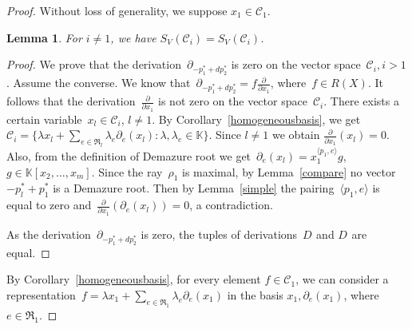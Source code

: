 \documentclass[a4paper,reqno,12pt]{amsart}
\DeclareMathOperator {\NNA}{(2)}
\DeclareMathOperator {\NA}{(1)}
\def\K  {\mathbb K}
\newtheorem{lmm}{Lemma}
\theoremstyle{definition}
\begin{document}
\begin{proof}
  Without loss of generality, we suppose $x_1 \in \mathcal{C}_1$.
  
  \begin{lmm}
    For $i \neq 1$, we have $S_{V^{\NA}}(\mathcal{C}_i) = S_{V^{\NNA}}(\mathcal{C}_i)$.
  \end{lmm}
  \begin{proof}
    
    We prove that the derivation~$\partial_{-p_1^*+dp_2^*}$ is zero on the vector space~${\mathcal C_i, i>1}$.
    Assume the converse.
    We know that~${\partial_{-p_1^*+dp_2^*} = f\frac{\partial}{\partial x_1}}$, where~${f \in {R}(X)}$.
    It follows that the derivation~$\frac{\partial}{\partial x_1}$ is not zero on the vector space~$\mathcal{C}_i$.
    There exists a certain variable~${x_{l} \in \mathcal{C}_i}$, ${l \neq 1}$.
    By Corollary~\ref{homogeneousbasis}, we get~${\mathcal{C}_i = \{\lambda x_l + \sum_{e \in \mathfrak{R}_l}\lambda_e \partial_e(x_l) : \lambda, \lambda_e \in \K\}.}$
    Since $l \neq 1$ we obtain $\frac{\partial}{\partial x_1}(x_l) = 0$.
    Also, from the definition of Demazure root we get~${\partial_e(x_l) = x_1^{\langle p_1, e \rangle}g}$,
    ${g \in \K[x_2, \ldots, x_m]}$.
    Since the ray~$\rho_1$ is maximal, by Lemma~\ref{compare} no vector~$-p_l^* + p_1^*$ is a Demazure root.
    Then by Lemma~\ref{simple} the pairing~$\langle p_1, e \rangle$ is equal to zero
    and~$\frac{\partial}{\partial x_1}(\partial_e(x_l))=0$, a contradiction.

    As the derivation~$\partial_{-p_1^*+dp_2^*}$ is zero,   the tuples of derivations~$D^{\NA}$ and $D^{\NNA}$ are equal.
  \end{proof}
  By Corollary~\ref{homogeneousbasis}, for every element $f\in \mathcal{C}_1$, we can consider a representation~${f = \lambda x_1 + \sum\limits_{e\in \mathfrak R_1} \lambda_e \partial_e(x_1)}$ in the basis $x_1, \partial_e(x_1)$, where $e \in \mathfrak R_1$.


\end{proof}
\end{document}
